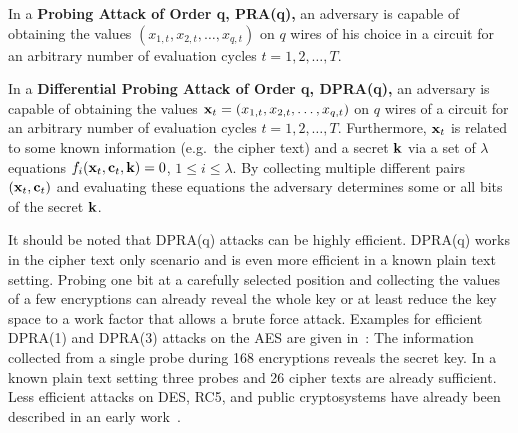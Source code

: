 \documentclass[11pt]{llncs}
\newcommand{\BDEF}{\begin{definition}}  \newcommand{\EDEF}{\end{definition}}
\newcommand{\eg}{{e.g.\ }}
\begin{document}
\BDEF
In a \textbf{Probing Attack of Order q, PRA(q),} an adversary
is capable of obtaining the values $(x_{1,t}, x_{2,t}, \dots, x_{q,t})$
on $q$ wires of his choice in a circuit for an arbitrary number of
evaluation cycles $t = 1, 2, \dots, T$.
\label{Def:PRA}
\EDEF

\BDEF
In a \textbf{Differential Probing Attack of Order q, DPRA(q),}
an adversary is capable of obtaining the values
$\mathbf{x}_t = (x_{1,t}, x_{2,t},\dots, x_{q,t})$ on $q$ wires of a circuit for
an arbitrary number of evaluation cycles $t = 1, 2, \dots, T$.
Furthermore, $\mathbf{x}_t$ is related to some known information
(\eg the cipher text) and a secret $\mathbf{k}$
via a set of $\lambda$ equations
$f_i(\mathbf{x}_t, \mathbf{c}_t, \mathbf{k}) = 0$, $1 \le i \le\lambda$.
By collecting multiple different pairs
$(\mathbf{x}_t, \mathbf{c}_t)$ and evaluating these equations
the adversary determines some or all bits of the secret $\mathbf{k}$.
\label{Def:DPRA}
\EDEF

It should be noted that DPRA(q) attacks can be highly efficient.
DPRA(q) works in the cipher text only scenario
and is even more efficient in a known plain text setting.
Probing one bit at a carefully selected position
and collecting the values of a few encryptions can already reveal
the whole key or at least reduce the key space to a
work factor that allows a brute force attack.
Examples for efficient DPRA(1) and DPRA(3) attacks on the AES
are given in~\cite{Schmidt2009ProbingAttackAES}:
The information collected from a single probe during 168 encryptions
reveals the secret key.
In a known plain text setting three probes and 26 cipher texts are already sufficient.
Less efficient attacks on DES, RC5, and public cryptosystems have already been described
in an early work~\cite{Handschuh1999ProbingAttackson}.
\end{document}
